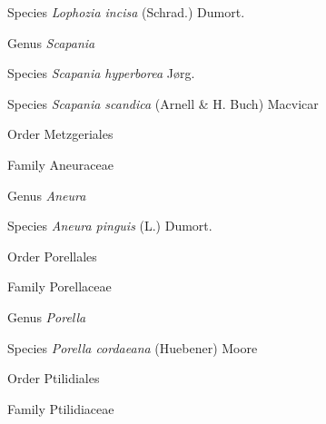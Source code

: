 \documentclass[9pt, article]{memoir}
\begin{document}
\begin{multicols}{2}
\vspace{6pt}\noindent\hspace{36pt}Species \textit{Lophozia incisa} (Schrad.) Dumort.


\vspace{6pt}\noindent\hspace{30pt}Genus \textit{Scapania}


\vspace{6pt}\noindent\hspace{36pt}Species \textit{Scapania hyperborea} Jørg.


\vspace{6pt}\noindent\hspace{36pt}Species \textit{Scapania scandica} (Arnell \& H. Buch) Macvicar


\vspace{6pt}\noindent\hspace{18pt}Order Metzgeriales


\vspace{6pt}\noindent\hspace{24pt}Family Aneuraceae


\vspace{6pt}\noindent\hspace{30pt}Genus \textit{Aneura}


\vspace{6pt}\noindent\hspace{36pt}Species \textit{Aneura pinguis} (L.) Dumort.


\vspace{6pt}\noindent\hspace{18pt}Order Porellales


\vspace{6pt}\noindent\hspace{24pt}Family Porellaceae


\vspace{6pt}\noindent\hspace{30pt}Genus \textit{Porella}


\vspace{6pt}\noindent\hspace{36pt}Species \textit{Porella cordaeana} (Huebener) Moore


\vspace{6pt}\noindent\hspace{18pt}Order Ptilidiales


\vspace{6pt}\noindent\hspace{24pt}Family Ptilidiaceae



\end{multicols}
\end{document}
